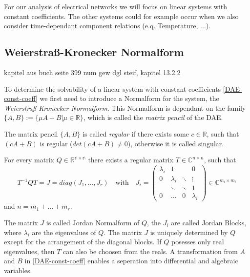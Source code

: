 	For our analysis of electrical networks we will focus on linear systems with constant coefficients. The other systems could for example occur when we also consider time-dependant component relations (e.q. Temperature, ...).

\subsection{Weierstraß-Kronecker Normalform}
kapitel aus buch seite 399 num gew dgl steif, kapitel 13.2.2

To determine the solvability of a linear system with constant coefficients \ref{DAE-const-coeff} we first need to introduce a Normalform for the system, the \emph{Weierstraß-Kronecker Normalform}. This Normalform is dependant on the family $\{A,B\} := \{ \mu A+B|\mu \in \mathbb{R} \}$, which is called the  \emph{matrix pencil} of the DAE.

\begin{definition}
	The matrix pencil $\{ A,B\}$ is called \emph{regular} if there exists some $c \in \mathbb{R}$, such that $(cA+B)$ is regular ($det(cA+B) \neq 0$), otherwise it is called singular.
\end{definition}

\begin{theorem}
	For every matrix $Q \in \mathbb{R^{n \times n}}$ there exists a regular matrix $T \in \mathbb{C}^{n \times n}$, such that
	\begin{displaymath}
		T^{-1}QT = J = diag(J_1, ..., J_r) \quad \text{with} \quad J_i = 
		\left(
		\begin{matrix}
			\lambda_i & 1 & & 0 \\
			0 & \lambda_i & \ddots & \vdots \\
			& \ddots & \ddots & 1 \\
			0 & \hdots & 0 & \lambda_i
		\end{matrix}
		\right)
		\in \mathbb{C}^{m_i \times m_i}
	\end{displaymath} 
	and $n = m_1 + ... + m_r$.
\end{theorem}

The matrix $J$ is called Jordan Normalform of $Q$, the $J_i$ are called Jordan Blocks, where $\lambda_i$ are the eigenvalues of $Q$. The matrix $J$ is uniquely determined by $Q$ except for the arrangement of the diagonal blocks. If $Q$ posesses only real eigenvalues, then $T$ can also be choosen from the reals. \newline
A transformation from $A$ and $B$ in \ref{DAE-const-coeff} enables a seperation into differential and algebraic variables.	

